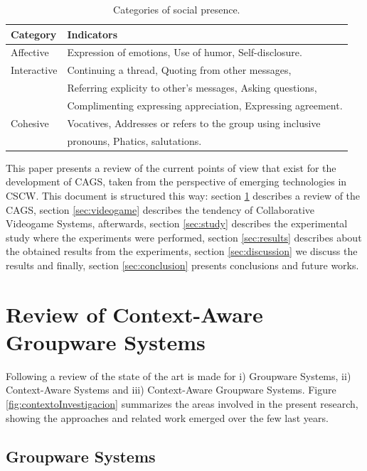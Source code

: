 \documentclass{./sty/llncs}
\begin{document}
\begin{table}[htbp]
	\centering
	\begin{tabular}{ll}
			\hline
		 	Category & Indicators \\
			\hline
			 Affective & Expression of emotions, Use of humor, Self-disclosure.   \\
			 Interactive &  Continuing a thread, Quoting from other messages,   \\
			 & Referring explicity  to other's messages, Asking questions, \\
			 & Complimenting expressing appreciation, Expressing agreement.   \\
			 Cohesive & Vocatives, Addresses or refers to the group using inclusive \\
			 & pronouns, Phatics, salutations. \\
			\hline	 
	\end{tabular}
	\caption{Categories of social presence.}
	\label{tab:socialPresence}
\end{table}

This paper presents a review of the current points of view that exist for the development of CAGS, taken from the perspective of emerging technologies in CSCW. This document is structured this way: section \ref{sec:review} describes a review of the CAGS, section \ref{sec:videogame} describes the tendency of Collaborative Videogame Systems, afterwards, section \ref{sec:study} describes the experimental study where the experiments were performed, section \ref{sec:results} describes about the obtained results from the experiments, section \ref{sec:discussion} we discuss the results and finally, section \ref{sec:conclusion} presents conclusions and future works.

\section{Review of Context-Aware Groupware Systems} 
\label{sec:review}
Following a review of the state of the art is made for i) Groupware Systems, ii) Context-Aware Systems and iii) Context-Aware Groupware Systems. Figure \ref{fig:contextoInvestigacion} summarizes the areas involved in the present research, showing the approaches and related work emerged over the few last years.

\subsection{Groupware Systems}
\end{document}
